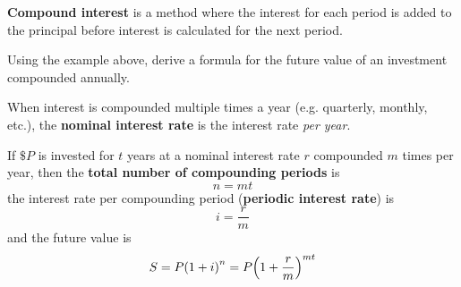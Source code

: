 \documentclass[../mathNotesPreamble]{subfiles}
\begin{document}
    \begin{minipage}{0.5\linewidth}
      \begin{center}
      \end{center}
    \end{minipage}

    \begin{defn*}
      \textbf{Compound interest} is a method where the interest for each period is added to the principal before interest is calculated for the next period.
    \end{defn*}
    \vspace*{0.5\baselineskip}

    \begin{ex*}
      Using the example above, derive a formula for the future value of an investment compounded annually.
    \end{ex*}
    \pagebreak

    \begin{defn*}
      When interest is compounded multiple times a year (e.g. quarterly, monthly, etc.), the \textbf{nominal interest rate} is the interest rate \emph{per year}.\newline

      If $\$P$ is invested for $t$ years at a nominal interest rate $r$ compounded $m$ times per year, then the \textbf{total number of compounding periods} is
        \[n=mt\]
      the interest rate per compounding period (\textbf{periodic interest rate}) is
        \[i=\frac{r}{m}\]
      and the future value is
        \[S=P{\left(1+i\right)}^n=P{\left(1+\frac{r}{m}\right)}^{mt}\]
    \end{defn*}
\end{document}

